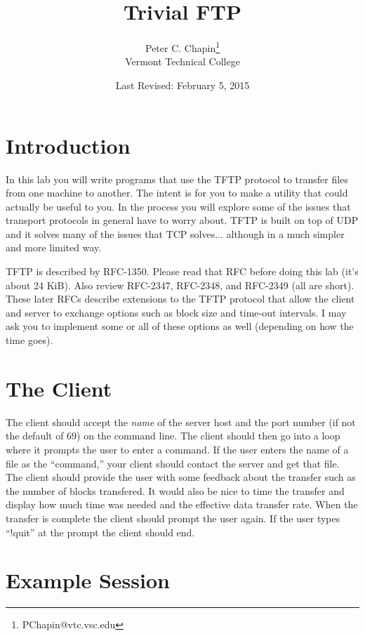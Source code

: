 \documentclass[twocolumn]{article}
\begin{document}
\title{Trivial FTP}
\author{Peter C. Chapin\thanks{PChapin@vtc.vsc.edu}\\
  Vermont Technical College}
\date{Last Revised: February 5, 2015}
\maketitle

\section*{Introduction}

In this lab you will write programs that use the TFTP protocol to transfer files from one
machine to another. The intent is for you to make a utility that could actually be useful to
you. In the process you will explore some of the issues that transport protocols in general have
to worry about. TFTP is built on top of UDP and it solves many of the issues that TCP solves...
although in a much simpler and more limited way.

TFTP is described by RFC-1350. Please read that RFC before doing this lab (it's about 24 KiB).
Also review RFC-2347, RFC-2348, and RFC-2349 (all are short). These later RFCs describe
extensions to the TFTP protocol that allow the client and server to exchange options such as
block size and time-out intervals. I may ask you to implement some or all of these options as
well (depending on how the time goes).

\section{The Client}

The client should accept the \emph{name} of the server host and the port number (if not the
default of 69) on the command line. The client should then go into a loop where it prompts the
user to enter a command. If the user enters the name of a file as the ``command,'' your client
should contact the server and get that file. The client should provide the user with some
feedback about the transfer such as the number of blocks transfered. It would also be nice to
time the transfer and display how much time was needed and the effective data transfer rate.
When the transfer is complete the client should prompt the user again. If the user types
``!quit'' at the prompt the client should end.

\section{Example Session}
\end{document}
